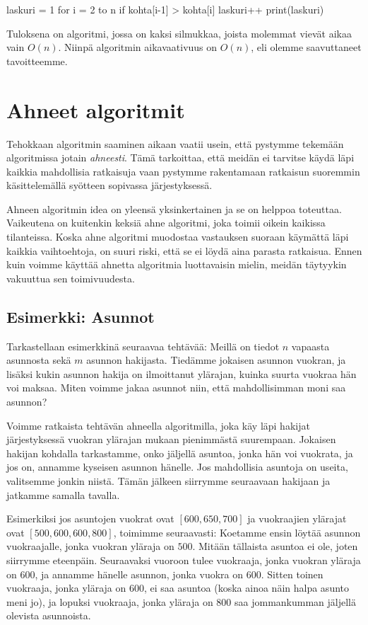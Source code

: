 \begin{code}
laskuri = 1
for i = 2 to n
    if kohta[i-1] > kohta[i]
        laskuri++
print(laskuri)
\end{code}

Tuloksena on algoritmi, jossa on kaksi silmukkaa,
joista molemmat vievät aikaa vain $O(n)$.
Niinpä algoritmin aikavaativuus on $O(n)$,
eli olemme saavuttaneet tavoitteemme.

\section{Ahneet algoritmit}

Tehokkaan algoritmin saaminen aikaan vaatii usein,
että pystymme tekemään algoritmissa jotain \emph{ahneesti}.
Tämä tarkoittaa, että meidän ei tarvitse käydä läpi
kaikkia mahdollisia ratkaisuja vaan pystymme rakentamaan
ratkaisun suoremmin käsittelemällä syötteen sopivassa järjestyksessä.

Ahneen algoritmin idea on yleensä yksinkertainen ja
se on helppoa toteuttaa.
Vaikeutena on kuitenkin keksiä ahne algoritmi,
joka toimii oikein kaikissa tilanteissa.
Koska ahne algoritmi muodostaa vastauksen suoraan
käymättä läpi kaikkia vaihtoehtoja, on suuri riski,
että se ei löydä aina parasta ratkaisua.
Ennen kuin voimme käyttää ahnetta algoritmia luottavaisin mielin,
meidän täytyykin vakuuttua sen toimivuudesta.

\subsection{Esimerkki: Asunnot}

Tarkastellaan esimerkkinä seuraavaa tehtävää:
Meillä on tiedot $n$ vapaasta asunnosta sekä
$m$ asunnon hakijasta.
Tiedämme jokaisen asunnon vuokran,
ja lisäksi kukin asunnon hakija on ilmoittanut
ylärajan, kuinka suurta vuok\-raa hän voi maksaa.
Miten voimme jakaa asunnot niin,
että mahdollisimman moni saa asunnon?

Voimme ratkaista tehtävän ahneella algoritmilla,
joka käy läpi hakijat järjestyksessä vuokran
ylärajan mukaan pienimmästä suurempaan.
Jokaisen hakijan kohdalla tarkastamme,
onko jäljellä asuntoa, jonka hän voi vuokrata,
ja jos on, annamme kyseisen asunnon hänelle.
Jos mahdollisia asuntoja on useita,
valitsemme jonkin niistä.
Tämän jälkeen siirrymme seuraavaan hakijaan
ja jatkamme samalla tavalla.

Esimerkiksi jos asuntojen vuokrat ovat $[600,650,700]$
ja vuokraajien ylä\-rajat ovat $[500,600,600,800]$,
toimimme seuraavasti:
Koetamme ensin löytää asunnon vuokraajalle,
jonka vuokran yläraja on $500$.
Mitään tällaista asuntoa ei ole, joten siirrymme eteenpäin.
Seuraavaksi vuoroon tulee vuokraaja, jonka vuokran yläraja on $600$,
ja annamme hänelle asunnon, jonka vuokra on $600$.
Sitten toinen vuokraaja, jonka yläraja on $600$,
ei saa asuntoa (koska ainoa näin halpa asunto meni jo),
ja lopuksi vuokraaja, jonka yläraja on $800$
saa jommankumman jäljellä olevista asunnoista.

